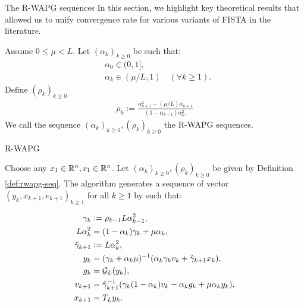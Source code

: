 \documentclass[11pt]{beamer}
\theoremstyle{definition}
\begin{document}
    \begin{frame}{The R-WAPG sequences}
        In this section, we highlight key theoretical results that allowed us to unify convergence rate for various variants of FISTA in the literature.
        \begin{definition}\label{def:rwapg-seq}
            Assume $0 \le \mu < L$. 
            Let $(\alpha_k)_{k \ge 0}$ be such that: 
            \begin{align*}
                & \alpha_0 \in (0, 1], \\
                & \alpha_k \in (\mu/L, 1) \quad (\forall k \ge 1). 
            \end{align*}    
            Define $(\rho_k)_{k \ge 0}$
            \begin{align*}
                \rho_k := \frac{\alpha_{k + 1}^2 - (\mu/L) \alpha_{k + 1}}{
                    (1 - \alpha_{k + 1}) \alpha_k^2.
                }
            \end{align*}
            We call the sequence $(\alpha_k)_{k \ge 0}, (\rho_k)_{k \ge0}$ the R-WAPG sequences. 
        \end{definition}
    \end{frame}
    \begin{frame}{R-WAPG}
        \begin{definition}[R-WAPG]\label{def:wapg}
            Choose any $x_1 \in \mathbb R^n, v_1 \in \mathbb R^n$.
            Let $(\alpha_k)_{k \ge0}, (\rho_k)_{k \ge 0}$ be given by Definition \ref{def:rwapg-seq}.
            The algorithm generates a sequence of vector $(y_k, x_{k + 1}, v_{k + 1})_{k \ge 1}$ for all $k\ge 1$ by such that:
            \begin{tcolorbox}\vspace{-1em}
                \begin{align*}
                    \gamma_k &\vcentcolon= \rho_{k -1}L\alpha_{k - 1}^2,
                    \\
                    L\alpha_k^2 &= (1 - \alpha_k)\gamma_k + \mu \alpha_k, 
                    \\
                    \hat \gamma_{k + 1} & \vcentcolon= L\alpha_k^2,
                    \\
                    y_k &=
                    (\gamma_k + \alpha_k \mu)^{-1}(\alpha_k \gamma_k v_k + \hat\gamma_{k + 1} x_k),
                    \\
                    g_k &= \mathcal G_L (y_k),
                    \\
                    v_{k + 1} &=
                    \hat\gamma^{-1}_{k + 1}
                    (\gamma_k(1 - \alpha_k) v_k - \alpha_k g_k + \mu \alpha_k y_k),
                    \\
                    x_{k + 1} &= T_L y_k.
                \end{align*}
            \end{tcolorbox}
        \end{definition}
    \end{frame}
\end{document}
